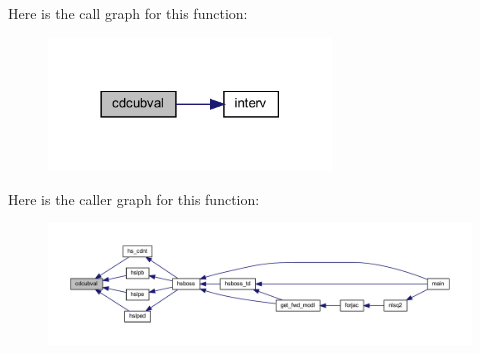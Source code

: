 Here is the call graph for this function\+:\nopagebreak
\begin{figure}[H]
\begin{center}
\leavevmode
\includegraphics[width=213pt]{Leroi_8f90_ab28d8a79c971f683b68fae4db0553909_cgraph}
\end{center}
\end{figure}
Here is the caller graph for this function\+:\nopagebreak
\begin{figure}[H]
\begin{center}
\leavevmode
\includegraphics[width=350pt]{Leroi_8f90_ab28d8a79c971f683b68fae4db0553909_icgraph}
\end{center}
\end{figure}
\mbox{\label{Leroi_8f90_a747a5bf7d69f6533bc2f54572584ba0c}} 
